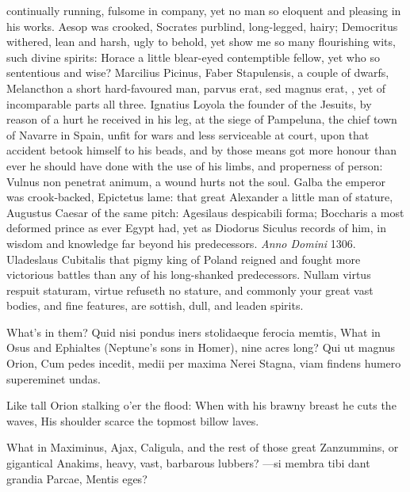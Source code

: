 {continually running, fulsome in company, yet no man so eloquent and
pleasing in his works. Aesop was crooked, Socrates purblind,
long-legged, hairy; Democritus withered, \Seneca lean and harsh, ugly to
behold, yet show me so many flourishing wits, such divine spirits:
Horace a little blear-eyed contemptible fellow, yet who so sententious
and wise? Marcilius Picinus, Faber Stapulensis, a couple of dwarfs,
Melancthon a short hard-favoured man, parvus erat, sed magnus
erat, \etc{}, yet of incomparable parts all three. Ignatius Loyola
the founder of the Jesuits, by reason of a hurt he received in his leg,
at the siege of Pampeluna, the chief town of Navarre in Spain, unfit
for wars and less serviceable at court, upon that accident betook
himself to his beads, and by those means got more honour than ever he
should have done with the use of his limbs, and properness of person:
Vulnus non penetrat animum, a wound hurts not the soul. Galba the
emperor was crook-backed, Epictetus lame: that great Alexander a little
man of stature, Augustus Caesar of the same pitch: Agesilaus
despicabili forma; Boccharis a most deformed prince as ever Egypt had,
yet as Diodorus Siculus records of him, in wisdom and knowledge
far beyond his predecessors. \emph{Anno Domini} 1306.  Uladeslaus
Cubitalis that pigmy king of Poland reigned and fought more victorious
battles than any of his long-shanked predecessors. Nullam virtus
respuit staturam, virtue refuseth no stature, and commonly your great
vast bodies, and fine features, are sottish, dull, and leaden spirits.

What's in them? Quid nisi pondus iners stolidaeque ferocia
memtis, What in Osus and Ephialtes (Neptune's sons in Homer), nine
acres long?
Qui ut magnus Orion,
Cum pedes incedit, medii per maxima Nerei
Stagna, viam findens humero supereminet undas.

Like tall Orion stalking o'er the flood:
When with his brawny breast he cuts the waves,
His shoulder scarce the topmost billow laves.

What in Maximinus, Ajax, Caligula, and the rest of those great
Zanzummins, or gigantical Anakims, heavy, vast, barbarous lubbers?
---si membra tibi dant grandia Parcae,
Mentis eges?

}
